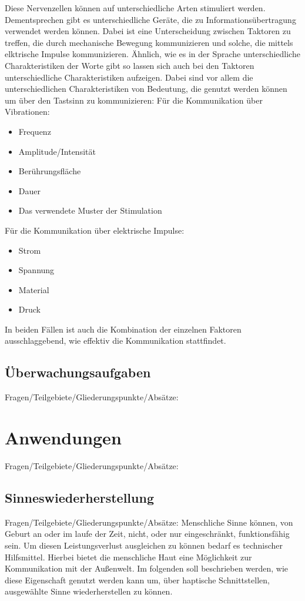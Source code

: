 \documentclass{llncs}					%
\begin{document}
Diese Nervenzellen können auf unterschiedliche Arten stimuliert werden. Dementsprechen gibt es unterschiedliche Geräte, die zu Informationsübertragung verwendet werden können. Dabei ist eine Unterscheidung zwischen Taktoren zu treffen, die durch mechanische Bewegung kommunizieren und solche, die mittels elktrische Impulse kommunizieren. Ähnlich, wie es in der Sprache unterschiedliche Charakteristiken der Worte gibt so lassen sich auch bei den Taktoren unterschiedliche Charakteristiken aufzeigen. Dabei sind vor allem die unterschiedlichen Charakteristiken von Bedeutung, die genutzt werden können um über den Tastsinn zu kommunizieren:
Für die Kommunikation über Vibrationen\cite{doi:10.1518/001872008X250638}:
\begin{itemize}
	\item Frequenz
	\item Amplitude/Intensität %
	\item Berührungsfläche
	\item Dauer
	\item Das verwendete Muster der Stimulation %
\end{itemize}

Für die Kommunikation über elektrische Impulse\cite[S.~4]{68204}:
\begin{itemize}
	\item Strom
	\item Spannung
	\item Material
	\item Druck %
\end{itemize}

In beiden Fällen ist auch die Kombination der einzelnen Faktoren ausschlaggebend, wie effektiv die Kommunikation stattfindet. 
\subsection{Überwachungsaufgaben}
Fragen/Teilgebiete/Gliederungspunkte/Absätze:

\section{Anwendungen}
Fragen/Teilgebiete/Gliederungspunkte/Absätze:

\subsection{Sinneswiederherstellung}
Fragen/Teilgebiete/Gliederungspunkte/Absätze:
Menschliche Sinne können, von Geburt an oder im laufe der Zeit, nicht, oder nur eingeschränkt, funktionsfähig sein. Um diesen Leistungsverlust ausgleichen zu können bedarf es technischer Hilfsmittel. Hierbei bietet die menschliche Haut eine Möglichkeit zur Kommunikation mit der Außenwelt. Im folgenden soll beschrieben werden, wie diese Eigenschaft genutzt werden kann um, über haptische Schnittstellen, ausgewählte Sinne wiederherstellen zu können.
\end{document}
